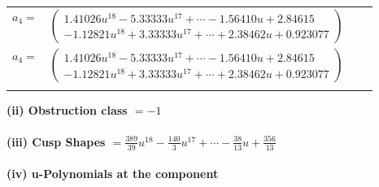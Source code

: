\documentclass[1p]{elsarticle_modified}
\theoremstyle{definition}
\begin{document}
\begin{tabular}{m{7pt} m{180pt} m{7pt} m{180pt} }
\flushright $a_{4}=$&$\begin{pmatrix}1.41026 u^{18}-5.33333 u^{17}+\cdots-1.56410 u+2.84615\\-1.12821 u^{18}+3.33333 u^{17}+\cdots+2.38462 u+0.923077\end{pmatrix}$\\ \flushright $a_{4}=$&$\begin{pmatrix}1.41026 u^{18}-5.33333 u^{17}+\cdots-1.56410 u+2.84615\\-1.12821 u^{18}+3.33333 u^{17}+\cdots+2.38462 u+0.923077\end{pmatrix}$\\&\end{tabular}
\flushleft \textbf{(ii) Obstruction class $= -1$}\\~\\
\flushleft \textbf{(iii) Cusp Shapes $= \frac{389}{39} u^{18}-\frac{140}{3} u^{17}+\cdots-\frac{38}{13} u+\frac{356}{13}$}\\~\\
\newpage\renewcommand{\arraystretch}{1}
\flushleft \textbf{(iv) u-Polynomials at the component}\newline \\
\end{document}
